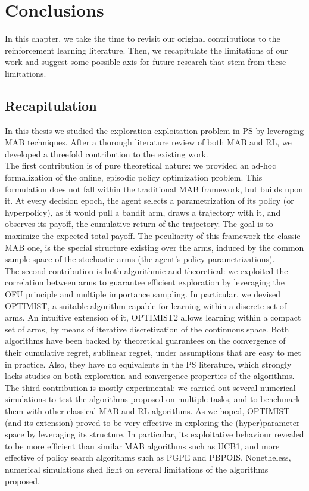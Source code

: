 
\chapter{Conclusions} \label{ch:conclusions}
In this chapter, we take the time to revisit our original contributions to the reinforcement learning literature. Then, we recapitulate the limitations of our work and suggest some possible
axis for future research that stem from these limitations.


\section{Recapitulation}
In this thesis we studied the exploration-exploitation problem in \gls{PS} by leveraging \gls{MAB} techniques. After a thorough literature review of both \gls{MAB} and \gls{RL}, we developed a threefold contribution to the existing work. \\
The first contribution is of pure theoretical nature: we provided an ad-hoc formalization of the online, episodic policy optimization problem. This formulation does not fall within the traditional \gls{MAB} framework, but builds upon it. At every decision epoch, the agent selects a parametrization of its policy (or hyperpolicy), as it would pull a bandit arm, draws a trajectory with it, and observes its payoff, \ie the cumulative return of the trajectory. The goal is to maximize the expected total payoff. The peculiarity of this framework \wrt the classic \gls{MAB} one, is the special structure existing over the arms, induced by the common sample space of the stochastic arms (the agent's policy parametrizations). \\
The second contribution is both algorithmic and theoretical: we exploited the correlation between arms to guarantee efficient exploration by leveraging the \gls{OFU} principle and multiple importance sampling. In particular, we devised \gls{OPTIMIST}, a suitable algorithm capable for learning within a discrete set of arms. An intuitive extension of it, \gls{OPTIMIST}2 allows learning within a compact set of arms, by means of iterative discretization of the continuous space. Both algorithms have been backed by theoretical guarantees on the convergence of their cumulative regret, \ie sublinear regret, under assumptions that are easy to met in practice. Also, they have no equivalents in the \gls{PS} literature, which strongly lacks studies on both exploration and convergence properties of the algorithms. \\
The third contribution is mostly experimental: we carried out several numerical simulations to test the algorithms proposed on multiple tasks, and to benchmark them with other classical \gls{MAB} and \gls{RL} algorithms. As we hoped, \gls{OPTIMIST} (and its extension) proved to be very effective in exploring the (hyper)parameter space by leveraging its structure. In particular, its exploitative behaviour revealed to be more efficient than similar \gls{MAB} algorithms such as \gls{UCB}1, and more effective of policy search algorithms such as \gls{PGPE} and \gls{PBPOIS}. Nonetheless, numerical simulations shed light on several limitations of the algorithms proposed.

